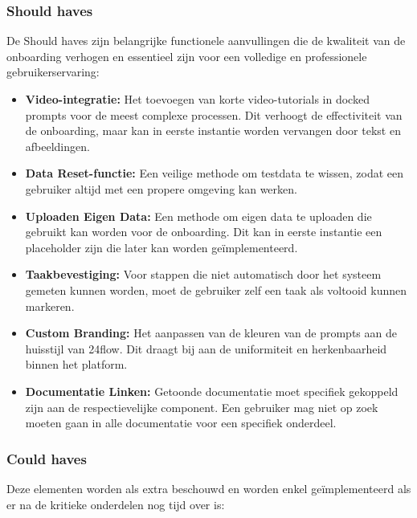\subsubsection{Should haves}
De Should haves zijn belangrijke functionele aanvullingen die de kwaliteit van de onboarding verhogen en essentieel zijn voor een volledige en professionele gebruikerservaring:

\begin{itemize}
	\item \textbf{Video-integratie:} Het toevoegen van korte video-tutorials in docked prompts voor de meest complexe processen. Dit verhoogt de effectiviteit van de onboarding, maar kan in eerste instantie worden vervangen door tekst en afbeeldingen.
	\item \textbf{Data Reset-functie:} Een veilige methode om testdata te wissen, zodat een gebruiker altijd met een propere omgeving kan werken.
	\item \textbf{Uploaden Eigen Data:} Een methode om eigen data te uploaden die gebruikt kan worden voor de onboarding. Dit kan in eerste instantie een placeholder zijn die later kan worden geïmplementeerd.
	\item \textbf{Taakbevestiging:} Voor stappen die niet automatisch door het systeem gemeten kunnen worden, moet de gebruiker zelf een taak als voltooid kunnen markeren.
	\item \textbf{Custom Branding:} Het aanpassen van de kleuren van de prompts aan de huisstijl van 24flow. Dit draagt bij aan de uniformiteit en herkenbaarheid binnen het platform.
	\item \textbf{Documentatie Linken:} Getoonde documentatie moet specifiek gekoppeld zijn aan de respectievelijke component. Een gebruiker mag niet op zoek moeten gaan in alle documentatie voor een specifiek onderdeel.
\end{itemize}

\subsubsection{Could haves}
Deze elementen worden als extra beschouwd en worden enkel geïmplementeerd als er na de kritieke onderdelen nog tijd over is:

